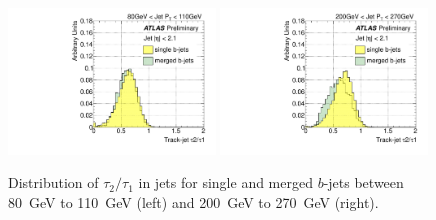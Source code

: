 \begin{figure}[tp]
\centering
\includegraphics[width=0.49\textwidth]{FIGS/VarsSingleMerged/TauRatio080.pdf}
\includegraphics[width=0.49\textwidth]{FIGS/VarsSingleMerged/TauRatio200.pdf}
\caption{Distribution of $\tau_2/\tau_1$ in jets for single and merged $b$-jets between 80~GeV to 110~GeV (left) and 200~GeV to 270~GeV (right).}
\label{fig:tauratiosinglemerged}
\end{figure}




